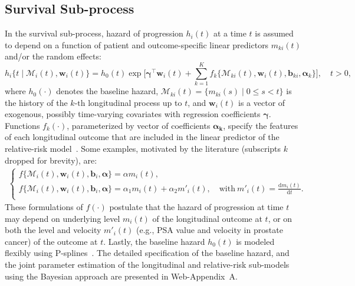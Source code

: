 \documentclass[useAMS, usenatbib, referee]{biom}
\begin{document}
\subsection{Survival Sub-process}
\label{subsec:surival_sub_model}
In the survival sub-process, hazard of progression $h_i(t)$ at a time $t$ is assumed to depend on a function of patient and outcome-specific linear predictors $m_{ki}(t)$ and/or the random effects:
\begin{equation*}
\label{eq:rel_risk_model}
h_i\big\{t \mid \mathcal{M}_i(t), \boldsymbol{w}_i(t)\big\} = h_0(t) \exp\Big[\boldsymbol{\gamma}^{\top}\boldsymbol{w}_i(t) + \sum_{k=1}^{K} f_{k} \big\{ \mathcal{M}_{ki}(t), \boldsymbol{w}_i(t), \boldsymbol{b}_{ki}, \boldsymbol{\alpha}_{k} \big\}\Big], \quad t>0,
\end{equation*}
where $h_0(\cdot)$ denotes the baseline hazard, $\mathcal{M}_{ki}(t)=\{m_{ki}(s) \mid 0 \leq s < t \}$ is the history of the ${k\mbox{-th}}$ longitudinal process up to $t$, and $\boldsymbol{w}_i(t)$ is a vector of exogenous, possibly time-varying covariates with regression coefficients $\boldsymbol{\gamma}$. Functions $f_{k}(\cdot)$, parameterized by vector of coefficients $\boldsymbol{\alpha_{k}}$, specify the features of each longitudinal outcome that are included in the linear predictor of the relative-risk model~\citep{brown2009assessing,rizopoulos2012joint,taylor2013real}. Some examples, motivated by the literature (subscripts $k$ dropped for brevity), are:
\begin{eqnarray*}
\left \{
\begin{array}{l}
f\big\{\mathcal{M}_{i}(t), \boldsymbol{w}_i(t), \boldsymbol{b}_{i}, \boldsymbol{\alpha} \big\} = \alpha m_{i}(t),\\
f\big\{ \mathcal{M}_{i}(t), \boldsymbol{w}_i(t), \boldsymbol{b}_{i}, \boldsymbol{\alpha}\big\} = \alpha_1 m_{i}(t) + \alpha_2 m'_{i}(t),\quad \text{with}\  m'_{i}(t) = \frac{\mathrm{d}{m_{i}(t)}}{\mathrm{d}{t}}.\\
\end{array}
\right.
\end{eqnarray*}
These formulations of $f(\cdot)$ postulate that the hazard of progression at time $t$ may depend on underlying level $m_i(t)$ of the longitudinal outcome at $t$, or on both the level and velocity $m'_i(t)$ (e.g., PSA value and velocity in prostate cancer) of the outcome at $t$. Lastly, the baseline hazard $h_0(t)$ is modeled flexibly using P-splines~\citep{eilers1996flexible}. The detailed specification of the baseline hazard, and the joint parameter estimation of the longitudinal and relative-risk sub-models using the Bayesian approach are presented in Web-Appendix~A.
\end{document}
